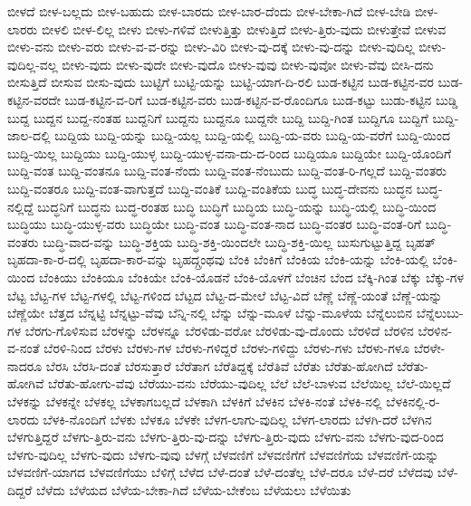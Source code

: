 {ಬೀಳದೆ
ಬೀಳ-ಬಲ್ಲದು
ಬೀಳ-ಬಹುದು
ಬೀಳ-ಬಾರದು
ಬೀಳ-ಬಾರ-ದೆಂದು
ಬೀಳ-ಬೇಕಾ-ಗಿದೆ
ಬೀಳ-ಬೇಡಿ
ಬೀಳ-ಲಾರರು
ಬೀಳಲಿ
ಬೀಳ-ಲಿಲ್ಲ
ಬೀಳು
ಬೀಳು-ಗಳಿವೆ
ಬೀಳುತ್ತಿತ್ತು
ಬೀಳುತ್ತಿದೆ
ಬೀಳು-ತ್ತಿರು-ವುದು
ಬೀಳುತ್ತೇವೆ
ಬೀಳುವ
ಬೀಳು-ವನು
ಬೀಳು-ವರು
ಬೀಳು-ವ-ವ-ರನ್ನು
ಬೀಳು-ವಿರಿ
ಬೀಳು-ವು-ದಕ್ಕೆ
ಬೀಳು-ವು-ದನ್ನು
ಬೀಳು-ವುದಿಲ್ಲ
ಬೀಳು-ವುದಿಲ್ಲ-ವಲ್ಲ
ಬೀಳು-ವುದು
ಬೀಳು-ವುದೇ
ಬೀಳು-ವುದೊ
ಬೀಳು-ವುವು
ಬೀಳು-ವುವೋ
ಬೀಳು-ವೆವು
ಬೀಸಿ-ದನು
ಬೀಸುತ್ತಿದೆ
ಬೀಸುವ
ಬೀಸು-ವುದು
ಬುಟ್ಟಿಗೆ
ಬುಟ್ಟಿ-ಯನ್ನು
ಬುಟ್ಟಿ-ಯಾಗ-ದಿ-ರಲಿ
ಬುಡ-ಕಟ್ಟಿನ
ಬುಡ-ಕಟ್ಟಿನ-ವರ
ಬುಡ-ಕಟ್ಟಿನ-ವರದೇ
ಬುಡ-ಕಟ್ಟಿನ-ವ-ರಿಗೆ
ಬುಡ-ಕಟ್ಟಿನ-ವರು
ಬುಡ-ಕಟ್ಟಿನ-ವ-ರೊಂದಿಗೂ
ಬುಡ-ಕಟ್ಟು
ಬುಡು-ಕಟ್ಟಿನ
ಬುಡ್ಡಿ
ಬುದ್ದ
ಬುದ್ದನ
ಬುದ್ದ-ನಂತಹ
ಬುದ್ದನಿಗೆ
ಬುದ್ದನು
ಬುದ್ದನೂ
ಬುದ್ದನೇ
ಬುದ್ದಿ
ಬುದ್ದಿ-ಗಿಂತ
ಬುದ್ದಿಗೂ
ಬುದ್ದಿಗೆ
ಬುದ್ದಿ-ಜಾಲ-ದಲ್ಲಿ
ಬುದ್ದಿಯ
ಬುದ್ದಿ-ಯನ್ನು
ಬುದ್ದಿ-ಯಲ್ಲ
ಬುದ್ದಿ-ಯಲ್ಲಿ
ಬುದ್ದಿ-ಯ-ವರು
ಬುದ್ದಿ-ಯ-ವರೆಗೆ
ಬುದ್ದಿ-ಯಿಂದ
ಬುದ್ದಿ-ಯಿಲ್ಲ
ಬುದ್ದಿಯು
ಬುದ್ದಿ-ಯುಳ್ಳ
ಬುದ್ದಿ-ಯುಳ್ಳ-ವನಾ-ದು-ದ-ರಿಂದ
ಬುದ್ದಿಯೂ
ಬುದ್ದಿಯೇ
ಬುದ್ದಿ-ಯೊಂದಿಗೆ
ಬುದ್ದಿ-ವಂತ
ಬುದ್ದಿ-ವಂತನೂ
ಬುದ್ದಿ-ವಂತ-ನೆಂದು
ಬುದ್ದಿ-ವಂತ-ನೆಂಬುದು
ಬುದ್ದಿ-ವಂತ-ರಿ-ಗಲ್ಲದೆ
ಬುದ್ದಿ-ವಂತರು
ಬುದ್ದಿ-ವಂತರೂ
ಬುದ್ದಿ-ವಂತ-ವಾಗುತ್ತದೆ
ಬುದ್ದಿ-ವಂತಿಕೆ
ಬುದ್ದಿ-ವಂತಿಕೆಯ
ಬುದ್ಧ
ಬುದ್ಧ-ದೇವನು
ಬುದ್ಧನ
ಬುದ್ಧ-ನಲ್ಲಿದ್ದೆ
ಬುದ್ಧನಿಗೆ
ಬುದ್ಧನು
ಬುದ್ಧ-ರಂತಹ
ಬುದ್ಧಿ
ಬುದ್ಧಿಗೆ
ಬುದ್ಧಿಯ
ಬುದ್ಧಿ-ಯನ್ನು
ಬುದ್ಧಿ-ಯಲ್ಲಿ
ಬುದ್ಧಿ-ಯಿಂದ
ಬುದ್ಧಿಯು
ಬುದ್ಧಿ-ಯುಳ್ಳ-ವರು
ಬುದ್ಧಿಯೇ
ಬುದ್ಧಿ-ವಂತ
ಬುದ್ಧಿ-ವಂತ-ನಾದ
ಬುದ್ಧಿ-ವಂತರ
ಬುದ್ಧಿ-ವಂತ-ರಿಗೆ
ಬುದ್ಧಿ-ವಂತರು
ಬುದ್ಧಿ-ವಾದ-ವನ್ನು
ಬುದ್ಧಿ-ಶಕ್ತಿಯ
ಬುದ್ಧಿ-ಶಕ್ತಿ-ಯಿಂದಲೇ
ಬುದ್ಧಿ-ಶಕ್ತಿ-ಯಿಲ್ಲ
ಬುಸುಗುಟ್ಟುತ್ತಿದ್ದ
ಬೃಹತ್
ಬೃಹದಾ-ಕಾ-ರ-ದಲ್ಲಿ
ಬೃಹದಾ-ಕಾರ-ವನ್ನು
ಬೃಹದ್ಗ್ರಂಥವು
ಬೆಂಕಿ
ಬೆಂಕಿಗೆ
ಬೆಂಕಿಯ
ಬೆಂಕಿ-ಯನ್ನು
ಬೆಂಕಿ-ಯಲ್ಲಿ
ಬೆಂಕಿ-ಯಿಂದ
ಬೆಂಕಿಯು
ಬೆಂಕಿಯೂ
ಬೆಂಕಿಯೇ
ಬೆಂಕಿ-ಯೊಡನೆ
ಬೆಂಕಿ-ಯೊಳಗೆ
ಬೆಂಚಿನ
ಬೆಂದ
ಬೆಕ್ಕಿ-ಗಿಂತ
ಬೆಕ್ಕು
ಬೆಕ್ಕು-ಗಳ
ಬೆಟ್ಟ
ಬೆಟ್ಟ-ಗಳ
ಬೆಟ್ಟ-ಗಳಲ್ಲಿ
ಬೆಟ್ಟ-ಗಳಿಂದ
ಬೆಟ್ಟದ
ಬೆಟ್ಟ-ದ-ಮೇಲೆ
ಬೆಟ್ಟ-ವಿದೆ
ಬೆಣ್ಣೆ
ಬೆಣ್ಣೆ-ಯಂತೆ
ಬೆಣ್ಣೆ-ಯನ್ನು
ಬೆಣ್ಣೆಯೇ
ಬೆತ್ತದ
ಬೆನ್ನಟ್ಟಿ
ಬೆನ್ನಟ್ಟು-ವೆವು
ಬೆನ್ನಿ-ನಲ್ಲಿ
ಬೆನ್ನು
ಬೆನ್ನು-ಮೂಳೆ
ಬೆನ್ನು-ಮೂಳೆಯ
ಬೆನ್ನೆಲುಬಿನ
ಬೆನ್ನೆಲುಬು-ಗಳ
ಬೆರಗು-ಗೊಳಿಸುವ
ಬೆರಳನ್ನು
ಬೆರಳನ್ನೂ
ಬೆರಳಿಡು-ವರೋ
ಬೆರಳಿಡು-ವು-ದೊಂದು
ಬೆರಳಿದೆ
ಬೆರಳಿನ
ಬೆರಳಿನ-ವ-ನಂತೆ
ಬೆರಳಿ-ನಿಂದ
ಬೆರಳು
ಬೆರಳು-ಗಳ
ಬೆರಳು-ಗಳಿದ್ದರೆ
ಬೆರಳು-ಗಳಿದ್ದು
ಬೆರಳು-ಗಳು
ಬೆರಳು-ಗಳೂ
ಬೆರಳೇ-ನಾದರೂ
ಬೆರಸಿ
ಬೆರಸಿ-ದಂತೆ
ಬೆರಸುತ್ತಾರೆ
ಬೆರೆತಾಗ
ಬೆರೆತಿದ್ದಕ್ಕೆ
ಬೆರೆತಿವೆ
ಬೆರೆತು
ಬೆರೆತು-ಹೋಗಿದೆ
ಬೆರೆತು-ಹೋಗಿವೆ
ಬೆರೆತು-ಹೋಗು-ವೆವು
ಬೆರೆಯು-ವನು
ಬೆರೆಯು-ವುದಿಲ್ಲ
ಬೆಲೆ
ಬೆಲೆ-ಬಾಳುವ
ಬೆಲೆಯಿಲ್ಲ
ಬೆಲೆ-ಯಿಲ್ಲದೆ
ಬೆಳಕನ್ನು
ಬೆಳಕನ್ನೇ
ಬೆಳಕಲ್ಲ
ಬೆಳಕಾಗಬಲ್ಲದೆ
ಬೆಳಕಾಗಿ
ಬೆಳಕಿಗೆ
ಬೆಳಕಿನ
ಬೆಳಕಿ-ನಂತೆ
ಬೆಳಕಿ-ನಲ್ಲಿ
ಬೆಳಕಿನಲ್ಲಿ-ರ-ಲಾರದು
ಬೆಳಕಿ-ನೊಂದಿಗೆ
ಬೆಳಕು
ಬೆಳಕೂ
ಬೆಳಕೇ
ಬೆಳಗ-ಲಾಗು-ವುದಿಲ್ಲ
ಬೆಳಗ-ಲಾರದು
ಬೆಳಗಿ-ದರೆ
ಬೆಳಗಿನ
ಬೆಳಗುತ್ತಿದ್ದರೆ
ಬೆಳಗು-ತ್ತಿರು-ವನು
ಬೆಳಗು-ತ್ತಿರು-ವು-ದನ್ನು
ಬೆಳಗು-ತ್ತಿರು-ವುದು
ಬೆಳಗು-ವನು
ಬೆಳಗು-ವುದ-ರಿಂದ
ಬೆಳಗು-ವುದಿಲ್ಲ
ಬೆಳಗು-ವುದು
ಬೆಳಗು-ವುವು
ಬೆಳಗ್ಗೆ
ಬೆಳವಣಿಗೆ
ಬೆಳವಣಿಗೆಗೆ
ಬೆಳವಣಿಗೆಯ
ಬೆಳವಣಿಗೆ-ಯನ್ನು
ಬೆಳವಣಿಗೆ-ಯಾಗದ
ಬೆಳವಣಿಗೆಯು
ಬೆಳಿಗ್ಗೆ
ಬೆಳೆದ
ಬೆಳೆ-ದಂತೆ
ಬೆಳೆ-ದಂತೆಲ್ಲ
ಬೆಳೆ-ದರೂ
ಬೆಳೆ-ದರೆ
ಬೆಳೆದವು
ಬೆಳೆ-ದಿದ್ದರೆ
ಬೆಳೆದು
ಬೆಳೆಯದ
ಬೆಳೆಯ-ಬೇಕಾ-ಗಿದೆ
ಬೆಳೆಯ-ಬೇಕೆಂಬ
ಬೆಳೆಯಲು
ಬೆಳೆಯಿತು
}
